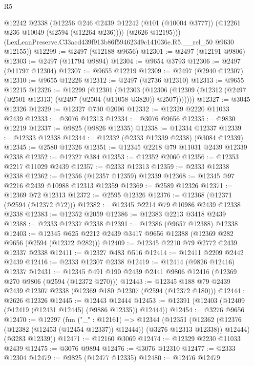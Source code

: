 \begin{lexlean}{R5}
\begin{coremodule}
          @12242
          @2338
          (@12256
            @246
            @2439
            @12242
            (@101 (@10004 @3777))
            (@12261 @236 @10049 (@2594 (@12264 @236))))
          (@2626 @12195)))
      (LexLeanPreserve.C33acd439f913b86f59462349c141036e.R5.__rel_50 @9630 @12155))
@12299 := @2497 (@12188 @9656)
@12301 := @2497 (@12191 @9806)
@12303 := @2497 (@11794 @9894)
@12304 := @9654 @3793
@12306 := @2497 (@11797 @12304)
@12307 := @9655 @12219
@12309 := @2497 (@2940 @12307)
@12310 := @9655 @12226
@12312 := @2497 (@2736 @12310)
@12313 := @9655 @12215
@12326 := @12299
    (@12301
      (@12303
        (@12306 (@12309 (@12312 (@2497 (@2501 @12313) (@2497 (@2504 (@11058 @3820)) @2507)))))))
@12327 := @3045 @12326
@12329 := @12327 @730 @2096
@12332 := @12329 @2220 @11033 @2439
@12333 := @3076 @12313
@12334 := @3076 @9656
@12335 := @9830 @12219
@12337 := @9825 (@9826 @12335)
@12338 := @12334 @12337
@12339 := @12333 @12338
@12344 := @12332 (@2333 @12339 @2338) (@3084 @12339)
@12345 := @2580 @12326
@12351 := @12345 @2218 @79 @11031 @2439 @12339 @2338
@12352 := @12327 @384
@12353 := @12352 @2060
@12356 := @12353 @2217 @11029 @2439
@12357 := @2333 @12313
@12359 := @2333 @12338 @2338
@12362 := @12356 (@12357 @12359) @12339
@12368 := @12345 @97 @2216 @2439 @10988 @12313 @12359
@12369 := @2589 @12326
@12371 := @12369 @72 @12313
@12372 := @2595 @12326
@12376 := @12368 (@12371 (@2594 (@12372 @72)))
@12382 := @12345 @2214 @79 @10986 @2439 @12338 @2338
@12383 := @12352 @2059
@12386 := @12383 @2213 @3418 @2439
@12388 := @2333 @12337 @2338
@12391 := @12386 (@9657 @12388) @12338
@12403 := @12345 @625 @2212 @2439 @3417 @9656 @12388 (@12369 @282 @9656 (@2594 (@12372 @282)))
@12409 := @12345 @2210 @79 @2772 @2439 @12337 @2338
@12411 := @12327 @483 @516
@12414 := @12411 @2209 @2442 @2439
@12416 := @2333 @12307 @2338
@12419 := @12414 (@9826 @12416) @12337
@12431 := @12345 @491 @190 @2439 @2441 @9806 @12416 (@12369 @270 @9806 (@2594 (@12372 @270)))
@12443 := @12345 @188 @79 @2439 @2439 @12307 @2338 (@12369 @180 @12307 (@2594 (@12372 @180)))
@12444 := @2626 @12326
@12445 := @12443 @12444
@12453 := @12391 (@12403 (@12409 (@12419 (@12431 @12445) (@9886 @12335)) @12444))
@12454 := @3276 @9656
@12470 := @12297
    (fun ("_" : @12161) =>
    @12344
      (@12351
        (@12362 (@12376 (@12382 (@12453 (@12454 @12337)) @12444)) (@3276 @12313 @12338))
        @12444)
      (@3283 @12339))
@12471 := @12160 @3069
@12474 := @12329 @2230 @11033 @2439
@12475 := @3076 @9894
@12476 := @3076 @12310
@12477 := @2333 @12304
@12479 := @9825 (@12477 @12335)
@12480 := @12476 @12479

\end{coremodule}
\end{lexlean}
